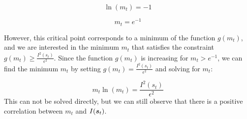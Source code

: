\[
\ln(m_t) = -1
\]

\[
m_t = e^{-1}
\]

However, this critical point corresponds to a minimum of the function $g(m_t)$, and we are interested in the minimum $m_t$ that satisfies the constraint $g(m_t) \geq \frac{I^2(s_t)}{\epsilon^2}$. Since the function $g(m_t)$ is increasing for $m_t > e^{-1}$, we can find the minimum $m_t$ by setting $g(m_t) = \frac{I^2(s_t)}{\epsilon^2}$ and solving for $m_t$:

\[
m_t\ln(m_t) = \frac{I^2(s_t)}{\epsilon^2}
\]
This can not be solved directly, but we can still observe that there is a positive correlation between $m_t$ and $I({\bm{s}}_t)$.








